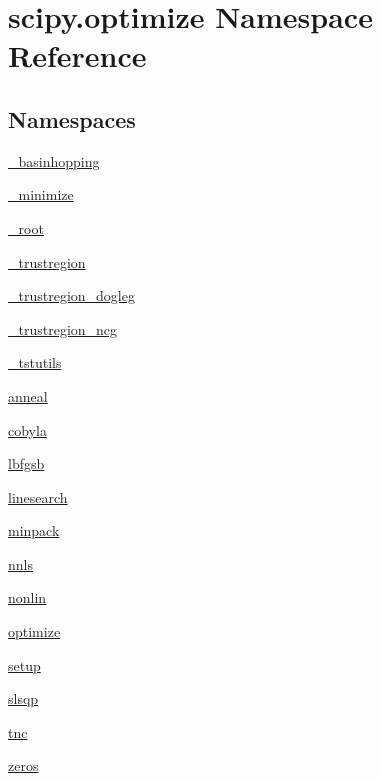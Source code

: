 \hypertarget{namespacescipy_1_1optimize}{}\section{scipy.\+optimize Namespace Reference}
\label{namespacescipy_1_1optimize}
\subsection*{Namespaces}
\begin{DoxyCompactItemize}
\item 
 \hyperlink{namespacescipy_1_1optimize_1_1__basinhopping}{\+\_\+basinhopping}
\item 
 \hyperlink{namespacescipy_1_1optimize_1_1__minimize}{\+\_\+minimize}
\item 
 \hyperlink{namespacescipy_1_1optimize_1_1__root}{\+\_\+root}
\item 
 \hyperlink{namespacescipy_1_1optimize_1_1__trustregion}{\+\_\+trustregion}
\item 
 \hyperlink{namespacescipy_1_1optimize_1_1__trustregion__dogleg}{\+\_\+trustregion\+\_\+dogleg}
\item 
 \hyperlink{namespacescipy_1_1optimize_1_1__trustregion__ncg}{\+\_\+trustregion\+\_\+ncg}
\item 
 \hyperlink{namespacescipy_1_1optimize_1_1__tstutils}{\+\_\+tstutils}
\item 
 \hyperlink{namespacescipy_1_1optimize_1_1anneal}{anneal}
\item 
 \hyperlink{namespacescipy_1_1optimize_1_1cobyla}{cobyla}
\item 
 \hyperlink{namespacescipy_1_1optimize_1_1lbfgsb}{lbfgsb}
\item 
 \hyperlink{namespacescipy_1_1optimize_1_1linesearch}{linesearch}
\item 
 \hyperlink{namespacescipy_1_1optimize_1_1minpack}{minpack}
\item 
 \hyperlink{namespacescipy_1_1optimize_1_1nnls}{nnls}
\item 
 \hyperlink{namespacescipy_1_1optimize_1_1nonlin}{nonlin}
\item 
 \hyperlink{namespacescipy_1_1optimize_1_1optimize}{optimize}
\item 
 \hyperlink{namespacescipy_1_1optimize_1_1setup}{setup}
\item 
 \hyperlink{namespacescipy_1_1optimize_1_1slsqp}{slsqp}
\item 
 \hyperlink{namespacescipy_1_1optimize_1_1tnc}{tnc}
\item 
 \hyperlink{namespacescipy_1_1optimize_1_1zeros}{zeros}
\end{DoxyCompactItemize}
